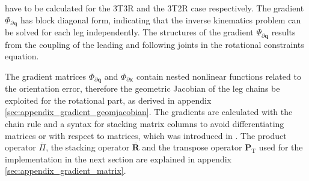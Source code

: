 \documentclass[robotics,article,submit,moreauthors,pdftex]{Definitions/mdpi}
\newcommand{\bm}[1]{\boldsymbol{#1}}
\newcommand{\transp}[0]{{\mathrm{T}}}
\let\Phi\varPhi
\let\Psi\varPsi
\begin{document}
%
have to be calculated for the 3T3R and the 3T2R case respectively.
The gradient $\bm{\Phi}_{\partial \bm{q}}$ has block diagonal form, indicating that the inverse kinematics problem can be solved for each leg independently.
The structures of the gradient $\bm{\Psi}_{\partial \bm{q}}$ results from the coupling of the leading and following joints in the rotational constraints equation.

The gradient matrices $\bm{\Phi}_{\partial \bm{q}}$ and $\bm{\Phi}_{\partial \bm{x}}$ contain nested nonlinear functions related to the orientation error, therefore\added[id=Sp]{,} the geometric Jacobian of the leg chains  be exploited for the rotational part, as derived in appendix\,\ref{sec:appendix_gradient_geomjacobian}.
The gradients are calculated with the chain rule and a syntax for stacking matrix columns to avoid differentiating matrices or with respect to matrices, which was introduced in \cite{1_SchapplerTapOrt2019}.
The product operator $\overline{\Pi}$, the stacking operator $\overline{\bm{R}}$ and the transpose operator $\bm{P}_\transp$ used for the implementation in the next section are explained in appendix\,\ref{sec:appendix_gradient_matrix}.
\end{document}
